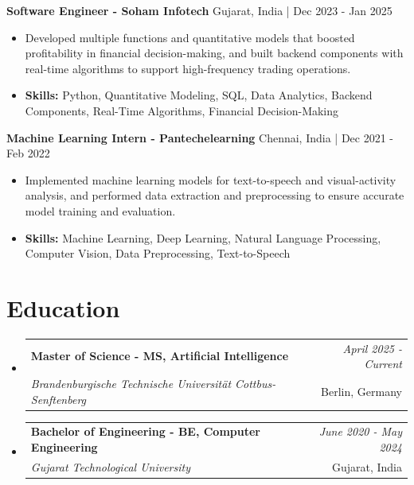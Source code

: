 \documentclass[a4paper,11pt]{article}
\makeatletter
\newcommand{\resumeSubheading}[4]{
\vspace{0.5mm}\item
    \begin{tabular*}{\linewidth}[t]{l@{\extracolsep{\fill}}r}
        \textbf{#1} & \textit{\footnotesize{#4}} \\
        \textit{\footnotesize{#3}} &  \footnotesize{#2}\\
    \end{tabular*}
    \vspace{-2.4mm}
}
\makeatother
\begin{document}
\vspace{1mm}
  \textbf{Software Engineer - Soham Infotech} \hfill Gujarat, India | Dec 2023 - Jan 2025
\vspace{-1.5mm} %
\begin{itemize}
  \item Developed multiple functions and quantitative models that boosted profitability in financial decision-making, and built backend components with real-time algorithms to support high-frequency trading operations.

\vspace{-2mm}
  \item \textbf{Skills:} Python, Quantitative Modeling, SQL, Data Analytics, Backend Components, Real-Time Algorithms, Financial Decision-Making
\end{itemize}

\vspace{1mm}
  \textbf{Machine Learning Intern - Pantechelearning} \hfill Chennai, India | Dec 2021 - Feb 2022
\vspace{-1.5mm} %
\begin{itemize}
  \item Implemented machine learning models for text-to-speech and visual-activity analysis, and performed data extraction and preprocessing to ensure accurate model training and evaluation.
\vspace{-2mm}
  \item \textbf{Skills:} Machine Learning, Deep Learning, Natural Language Processing, Computer Vision, Data Preprocessing, Text-to-Speech
\end{itemize}\section{\textbf{Education}}
\vspace{-0.4mm}

\begin{itemize}[leftmargin=0.15in, label={}]
\resumeSubheading
{Master of Science - MS, Artificial Intelligence }{Berlin, Germany}
{Brandenburgische Technische Universität Cottbus-Senftenberg  }{April 2025 - Current}

\vspace{1.0mm} %
\resumeSubheading
{Bachelor of Engineering - BE, Computer Engineering  }{Gujarat, India}
{Gujarat Technological University }{June 2020 - May 2024}

\end{itemize}
\end{document}
